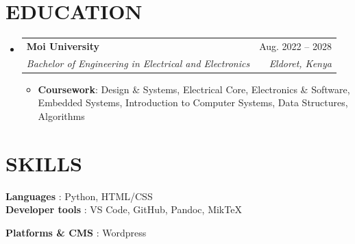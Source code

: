 \documentclass[letterpaper,11pt]{article}
\makeatletter
\newcommand{\resumeItem}[1]{
  \item\small{
    {#1 \vspace{-1pt}}
  }
}
\newcommand{\resumeSubheading}[4]{
  \vspace{-1pt}\item
    \begin{tabular*}{\textwidth}[t]{l@{\extracolsep{\fill}}r}
      \textbf{#1} & {\color{dark-grey}\small #2}\vspace{1pt}\\ %
      \textit{#3} & {\color{dark-grey} \small #4}\\ %
    \end{tabular*}\vspace{-4pt}
}
\newcommand{\resumeSubHeadingListStart}{\begin{itemize}[leftmargin=0in, label={}]}
\newcommand{\resumeSubHeadingListEnd}{\end{itemize}}
\newcommand{\resumeItemListStart}{\begin{itemize}}
\newcommand{\resumeItemListEnd}{\end{itemize}\vspace{0pt}}
\makeatother
\begin{document}
    
     

     
      
\section {EDUCATION}
  \resumeSubHeadingListStart
    \resumeSubheading
      {Moi University}{Aug. 2022 -- 2028}
      {Bachelor of Engineering in Electrical and Electronics} {\textit{Eldoret, Kenya}}
      	\resumeItemListStart
    	\resumeItem {\textbf{Coursework}: Design \& Systems, Electrical Core, Electronics \& Software, Embedded Systems, Introduction to Computer Systems, Data Structures, Algorithms}
        
        \resumeItemListEnd
  \resumeSubHeadingListEnd


%
\section{SKILLS}
 \begin{itemize}[leftmargin=0in, label={}]
    \small{\item{
     \textbf{Languages} {: Python, HTML/CSS}\vspace{2pt} \\
     \textbf{Developer tools}     {: VS Code, GitHub, Pandoc, MikTeX}
     
     \textbf{Platforms \& CMS} {: Wordpress}
     
    }}
 \end{itemize}


\end{document}
